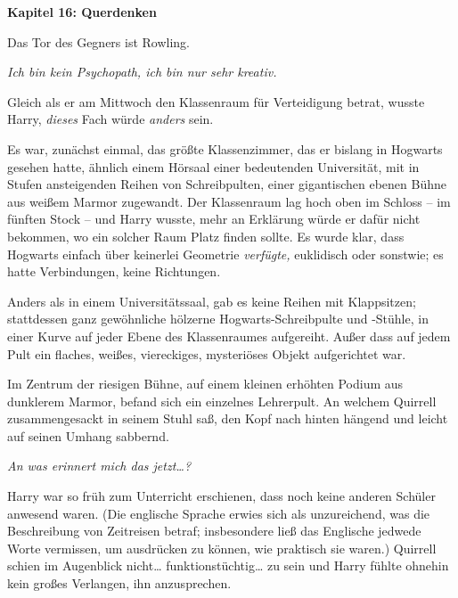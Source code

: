 

\hypertarget{querdenken}{%

\textbf{Kapitel 16: Querdenken}

Das Tor des Gegners ist Rowling.

\later

\emph{Ich bin kein Psychopath, ich bin nur sehr kreativ.}

\later

Gleich als er am Mittwoch den Klassenraum für Verteidigung betrat, wusste Harry, \emph{dieses} Fach würde \emph{anders} sein.

Es war, zunächst einmal, das größte Klassenzimmer, das er bislang in Hogwarts gesehen hatte, ähnlich einem Hörsaal einer bedeutenden Universität, mit in Stufen ansteigenden Reihen von Schreibpulten, einer gigantischen ebenen Bühne aus weißem Marmor zugewandt. Der Klassenraum lag hoch oben im Schloss -- im fünften Stock -- und Harry wusste, mehr an Erklärung würde er dafür nicht bekommen, wo ein solcher Raum Platz finden sollte. Es wurde klar, dass Hogwarts einfach über keinerlei Geometrie \emph{verfügte,} euklidisch oder sonstwie; es hatte Verbindungen, keine Richtungen.

Anders als in einem Universitätssaal, gab es keine Reihen mit Klappsitzen; stattdessen ganz gewöhnliche hölzerne Hogwarts-Schreibpulte und -Stühle, in einer Kurve auf jeder Ebene des Klassenraumes aufgereiht. Außer dass auf jedem Pult ein flaches, weißes, viereckiges, mysteriöses Objekt aufgerichtet war.

Im Zentrum der riesigen Bühne, auf einem kleinen erhöhten Podium aus dunklerem Marmor, befand sich ein einzelnes Lehrerpult. An welchem Quirrell zusammengesackt in seinem Stuhl saß, den Kopf nach hinten hängend und leicht auf seinen Umhang sabbernd.

\emph{An was erinnert mich das jetzt…?}

Harry war so früh zum Unterricht erschienen, dass noch keine anderen Schüler anwesend waren. (Die englische Sprache erwies sich als unzureichend, was die Beschreibung von Zeitreisen betraf; insbesondere ließ das Englische jedwede Worte vermissen, um ausdrücken zu können, wie praktisch sie waren.) Quirrell schien im Augenblick nicht… funktionstüchtig… zu sein und Harry fühlte ohnehin kein großes Verlangen, ihn anzusprechen.

}
